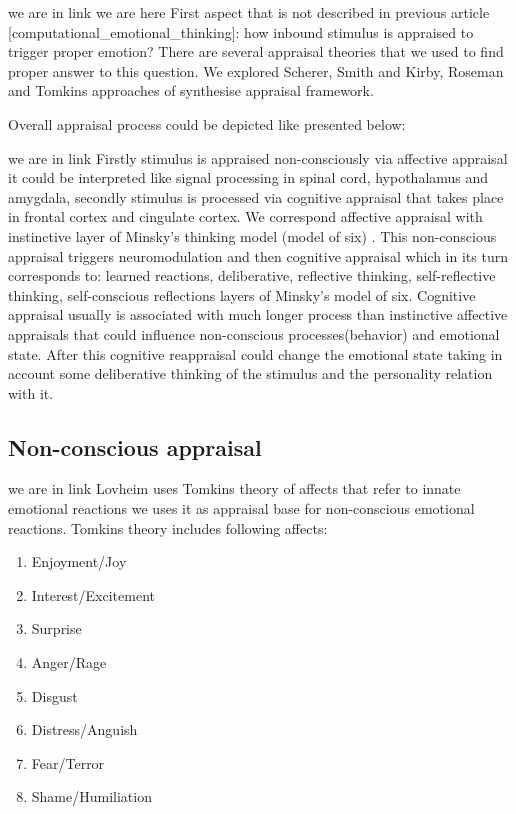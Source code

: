 we are in link
we are here First aspect that is not described in previous article [computational_emotional_thinking]: how inbound stimulus is appraised to trigger proper emotion? There are several appraisal theories that we used to find proper answer to this question. We explored Scherer, Smith and Kirby, Roseman and Tomkins  approaches of synthesise appraisal framework.

Overall appraisal process could be depicted like presented below:



we are in link
Firstly stimulus is appraised non-consciously via affective appraisal it could be interpreted like signal processing in spinal cord, hypothalamus and amygdala, secondly stimulus is processed via cognitive appraisal that takes place in frontal cortex and cingulate cortex. We correspond affective appraisal with instinctive layer of Minsky's thinking model (model of six) \cite{emotionmachine}. This non-conscious appraisal triggers neuromodulation \cite{cubeofemotions} and then cognitive appraisal which in its turn corresponds to: learned reactions, deliberative, reflective thinking, self-reflective thinking, self-conscious reflections layers of Minsky's model of six. Cognitive appraisal usually is associated with much longer process than instinctive affective appraisals that could influence non-conscious processes(behavior) and emotional state. After this cognitive reappraisal could change the emotional state taking in account some deliberative thinking of the stimulus and the personality relation with it.

\subsection{Non-conscious appraisal}

we are in link
Lovheim uses Tomkins theory of affects that refer to innate emotional reactions we uses it as appraisal base for non-conscious emotional reactions. Tomkins theory \cite{tomkins1, tomkins2, tomkins3, tomkins4} includes following affects:

\begin{enumerate}
\item  Enjoyment/Joy
\item  Interest/Excitement
\item  Surprise
\item  Anger/Rage
\item  Disgust
\item  Distress/Anguish
\item  Fear/Terror
\item  Shame/Humiliation
\end{enumerate}

